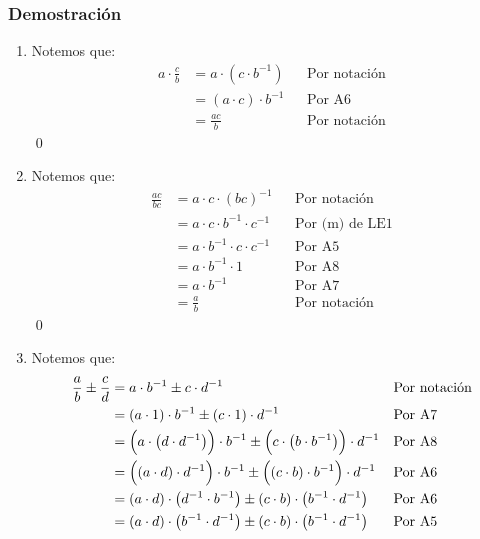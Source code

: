 \documentclass[11pt]{article}
\begin{document}
\subsubsection*{Demostración}

\begin{enumerate}[label=\alph*)]

\item Notemos que:%
\begin{align*}
    a \cdot \frac{c}{b} &= a \cdot \left( c \cdot b^{-1} \right) && \text{Por notación}\\
    &= \left( a \cdot c \right) \cdot b^{-1} && \text{Por A6}\\
    &= \frac{ac}{b} && \text{Por notación}
\end{align*} \qed
\item Notemos que:%
\begin{align*}
    \frac{ac}{bc} &= a \cdot c \cdot \left( bc \right)^{-1} && \text{Por notación}\\
    &= a \cdot c \cdot b^{-1} \cdot c^{-1} && \text{Por (m) de LE1}\\
    &= a \cdot b^{-1} \cdot c \cdot c^{-1} && \text{Por A5}\\
    &= a \cdot b^{-1} \cdot 1 && \text{Por A8}\\
    &= a \cdot b^{-1} && \text{Por A7}\\
    &= \frac{a}{b} && \text{Por notación}
\end{align*}\qed
\item Notemos que:%
\begin{align*}
\frac{a}{b} \pm \frac{c}{d}  &=	a \cdot b^{-1} \pm c \cdot d^{-1} && \text{Por notación}\\
&=	\left( a \cdot 1 \right)   \cdot b^{-1} \pm \left( c \cdot 1 \right) \cdot d^{-1} && \text{Por A7}\\
&=	\Bigl( a \cdot  \left( d \cdot d^{-1} \right) \Bigr) \cdot b^{-1} \pm \Bigl( c \cdot  \left( b \cdot b^{-1}  \right)  \Bigr)  \cdot d^{-1} && \text{Por A8}\\
&=	\Bigl(  \left( a \cdot d \right) \cdot d^{-1} \Bigr) \cdot b^{-1} \pm \Bigl(  \left( c \cdot b \right) \cdot b^{-1} \Bigr) \cdot d^{-1} && \text{Por A6}\\
&=	\left( a \cdot d \right)  \cdot  \left( d^{-1} \cdot b^{-1}  \right) \pm \left( c \cdot b \right)  \cdot  \left( b^{-1} \cdot d^{-1}  \right) && \text{Por A6}\\
&=	\left( a \cdot d \right)  \cdot  \left( b^{-1} \cdot d^{-1}  \right) \pm \left( c \cdot b \right)  \cdot  \left( b^{-1} \cdot d^{-1}  \right) && \text{Por A5}\\

\end{align*}
\end{enumerate}
\end{document}
